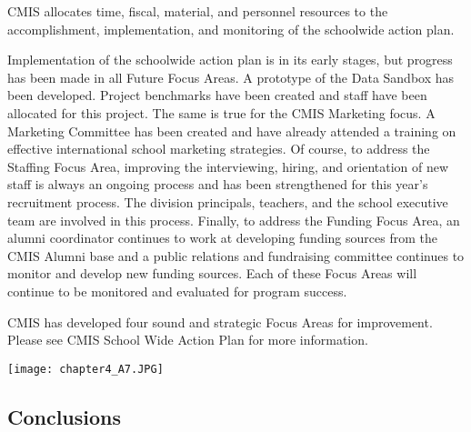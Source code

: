 \begin{findings}
CMIS allocates time, fiscal, material, and personnel resources to the accomplishment, implementation, and monitoring of the schoolwide action plan. 

Implementation of the schoolwide action plan is in its early stages, but progress has been made in all Future Focus Areas. A prototype of the Data Sandbox has been developed. Project benchmarks have been created and staff have been allocated for this project. The same is true for the CMIS Marketing focus. A Marketing Committee has been created and have already attended a training on effective international school marketing strategies. Of course, to address the Staffing Focus Area, improving the interviewing, hiring, and orientation of new staff is always an ongoing process and has been strengthened for this year’s recruitment process.  The division principals, teachers, and the school executive team are involved in this process. Finally, to address the Funding Focus Area, an alumni coordinator continues to work at developing funding sources from the CMIS Alumni base and a public relations and fundraising committee continues to monitor and develop new funding sources. Each of these Focus Areas will continue to be monitored and evaluated for program success. 

CMIS has developed four sound and strategic Focus Areas for improvement. Please see CMIS School Wide Action Plan for more information. 
\end{findings}


{\centering\texttt{[image: chapter4\_A7.JPG]}}


\subsection{Conclusions}

